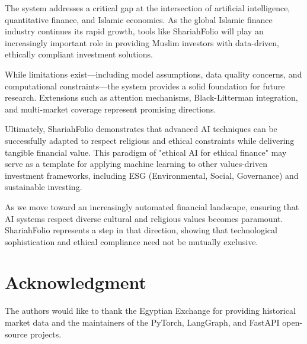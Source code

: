 \documentclass[conference]{IEEEtran}
\begin{document}
The system addresses a critical gap at the intersection of artificial intelligence, quantitative finance, and Islamic economics. As the global Islamic finance industry continues its rapid growth, tools like ShariahFolio will play an increasingly important role in providing Muslim investors with data-driven, ethically compliant investment solutions.

While limitations exist—including model assumptions, data quality concerns, and computational constraints—the system provides a solid foundation for future research. Extensions such as attention mechanisms, Black-Litterman integration, and multi-market coverage represent promising directions.

Ultimately, ShariahFolio demonstrates that advanced AI techniques can be successfully adapted to respect religious and ethical constraints while delivering tangible financial value. This paradigm of "ethical AI for ethical finance" may serve as a template for applying machine learning to other values-driven investment frameworks, including ESG (Environmental, Social, Governance) and sustainable investing.

As we move toward an increasingly automated financial landscape, ensuring that AI systems respect diverse cultural and religious values becomes paramount. ShariahFolio represents a step in that direction, showing that technological sophistication and ethical compliance need not be mutually exclusive.

\section*{Acknowledgment}

The authors would like to thank the Egyptian Exchange for providing historical market data and the maintainers of the PyTorch, LangGraph, and FastAPI open-source projects.
\end{document}
